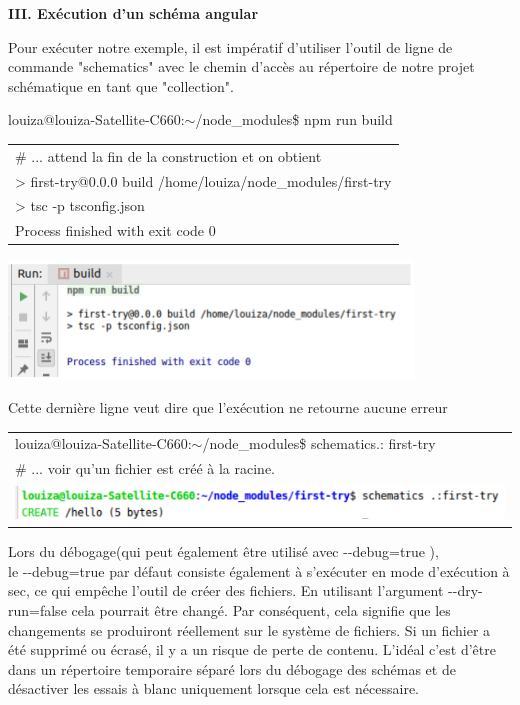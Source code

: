 \documentclass[12pt,french]{article}
\begin{document}
	\textbf{III. Exécution d'un  schéma angular}\newline
	
	Pour exécuter notre exemple, il est impératif d'utiliser l'outil de ligne de commande "schematics" avec le chemin d'accès au répertoire de notre projet \\schématique en tant que "collection".\newline  
	
	louiza@louiza-Satellite-C660:$\sim$/node\_modules\$ npm run build \newline
	
	\begin{tabular}{l}
		\# ... attend la fin de la construction et on obtient\\ 
		\qquad > first-try@0.0.0 build /home/louiza/node\_modules/first-try\\
		\qquad > tsc -p tsconfig.json
\\
		Process finished with exit code 0
	\end{tabular}\break
	
	\includegraphics[scale=0.75]{3.jpg} 

	Cette dernière ligne veut dire que l’exécution ne retourne aucune erreur\newline
	
	\begin{tabular}{l}
		louiza@louiza-Satellite-C660:$\sim$/node\_modules\$ schematics.: first-try \\
		\# ... voir qu'un fichier est créé à la racine. 
		
\\
		\includegraphics[scale=0.75]{4.jpg} 
	\end{tabular}\break

	Lors du débogage(qui peut également être utilisé avec \--\--debug=true ),\\ le \--\--debug=true par défaut consiste également à s'exécuter en mode d'exécution à sec, ce qui empêche l'outil de créer des fichiers.\newline
	En utilisant l'argument \--\--dry-run=false cela pourrait être changé. Par conséquent, cela signifie que les changements se produiront réellement sur le système de fichiers. Si un fichier a été supprimé ou écrasé, il y a un risque de perte de contenu. L'idéal c'est d’être dans un répertoire temporaire séparé lors du débogage des schémas et de désactiver les essais à blanc uniquement lorsque cela est nécessaire.\newline
	
\end{document}
